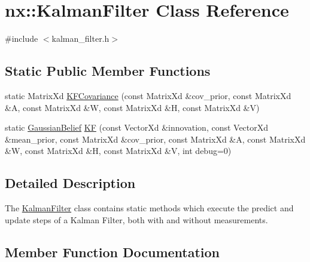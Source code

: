\hypertarget{classnx_1_1KalmanFilter}{}\section{nx\+:\+:Kalman\+Filter Class Reference}
\label{classnx_1_1KalmanFilter}


{\ttfamily \#include $<$kalman\+\_\+filter.\+h$>$}

\subsection*{Static Public Member Functions}
\begin{DoxyCompactItemize}
\item 
static Matrix\+Xd \hyperlink{classnx_1_1KalmanFilter_a1335cc928085a2c01b6a6a0d56e36903}{K\+F\+Covariance} (const Matrix\+Xd \&cov\+\_\+prior, const Matrix\+Xd \&A, const Matrix\+Xd \&W, const Matrix\+Xd \&H, const Matrix\+Xd \&V)
\item 
static \hyperlink{structnx_1_1GaussianBelief}{Gaussian\+Belief} \hyperlink{classnx_1_1KalmanFilter_a3c58332273552a6ea9133c54f3f74986}{KF} (const Vector\+Xd \&innovation, const Vector\+Xd \&mean\+\_\+prior, const Matrix\+Xd \&cov\+\_\+prior, const Matrix\+Xd \&A, const Matrix\+Xd \&W, const Matrix\+Xd \&H, const Matrix\+Xd \&V, int debug=0)
\end{DoxyCompactItemize}


\subsection{Detailed Description}
The \hyperlink{classnx_1_1KalmanFilter}{Kalman\+Filter} class contains static methods which execute the predict and update steps of a Kalman Filter, both with and without measurements. 

\subsection{Member Function Documentation}
\mbox{\label{classnx_1_1KalmanFilter_a3c58332273552a6ea9133c54f3f74986}} 
